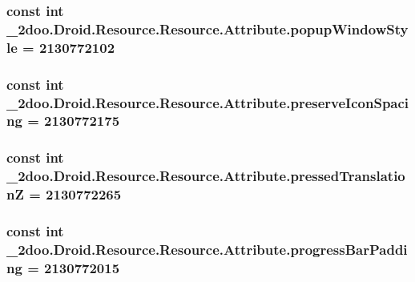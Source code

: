 \hypertarget{class__2doo_1_1_droid_1_1_resource_1_1_attribute_cb724909297f336969ceac25428df69a}{
\subsubsection[{popupWindowStyle}]{\setlength{\rightskip}{0pt plus 5cm}const int \_\-2doo.Droid.Resource.Resource.Attribute.popupWindowStyle = 2130772102}}
\label{class__2doo_1_1_droid_1_1_resource_1_1_attribute_cb724909297f336969ceac25428df69a}


\hypertarget{class__2doo_1_1_droid_1_1_resource_1_1_attribute_4702e093fd85dbbe65db141b798bb964}{
\subsubsection[{preserveIconSpacing}]{\setlength{\rightskip}{0pt plus 5cm}const int \_\-2doo.Droid.Resource.Resource.Attribute.preserveIconSpacing = 2130772175}}
\label{class__2doo_1_1_droid_1_1_resource_1_1_attribute_4702e093fd85dbbe65db141b798bb964}


\hypertarget{class__2doo_1_1_droid_1_1_resource_1_1_attribute_43491b16f550f7a44655ac86b5e8ba20}{
\subsubsection[{pressedTranslationZ}]{\setlength{\rightskip}{0pt plus 5cm}const int \_\-2doo.Droid.Resource.Resource.Attribute.pressedTranslationZ = 2130772265}}
\label{class__2doo_1_1_droid_1_1_resource_1_1_attribute_43491b16f550f7a44655ac86b5e8ba20}


\hypertarget{class__2doo_1_1_droid_1_1_resource_1_1_attribute_8d84c3cbabd1db5626a964f4a7b51ddb}{
\subsubsection[{progressBarPadding}]{\setlength{\rightskip}{0pt plus 5cm}const int \_\-2doo.Droid.Resource.Resource.Attribute.progressBarPadding = 2130772015}}
\label{class__2doo_1_1_droid_1_1_resource_1_1_attribute_8d84c3cbabd1db5626a964f4a7b51ddb}


